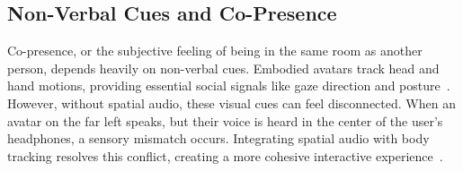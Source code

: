 \subsection{Non-Verbal Cues and Co-Presence}
Co-presence, or the subjective feeling of being in the same room as another person, depends heavily on non-verbal cues. Embodied avatars track head and hand motions, providing essential social signals like gaze direction and posture~\cite{nimbus2022embodiment}. However, without spatial audio, these visual cues can feel disconnected. When an avatar on the far left speaks, but their voice is heard in the center of the user's headphones, a sensory mismatch occurs. Integrating spatial audio with body tracking resolves this conflict, creating a more cohesive interactive experience~\cite{vertex2024interaction}.
